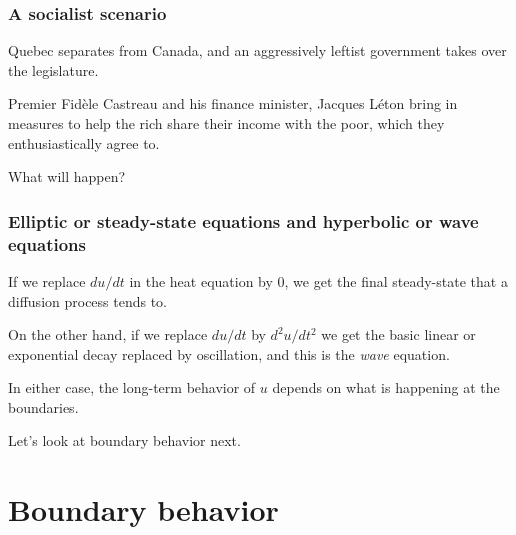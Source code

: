 \documentclass[11pt]{beamer}
\begin{document}

\begin{frame}


\frametitle{A socialist scenario}

\bi
  \item Quebec separates from Canada, and an aggressively leftist
  government takes over the legislature.
  \item Premier Fid\`ele Castreau and his finance minister,
  Jacques L\'eton bring in measures to help the rich share their
  income with the poor, which they enthusiastically agree to.
  \item What will happen?
\ei

\end{frame}


\begin{frame}


\frametitle{Elliptic or steady-state equations and hyperbolic or wave equations}

\bi
  \item If we replace $du/dt$ in the heat equation by 0, we
  get the final steady-state that a diffusion process
  tends to.
  \item On the other hand, if we replace $du/dt$ by $d^2u/dt^2$
  we get the basic linear or exponential decay replaced by
  oscillation, and this is the \emph{wave} equation.
  \item In either case, the long-term behavior of $u$
  depends on what is happening at the boundaries.
  \item Let's look at boundary behavior next.
\ei

\end{frame}



\section{Boundary behavior}
\end{document}
